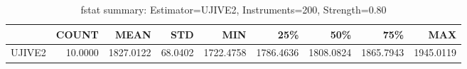 \begin{table}[ht]
\centering
\caption{fstat summary: Estimator=UJIVE2, Instruments=200, Strength=0.80}
\begin{tabular}{lrrrrrrrr}
\toprule
 & COUNT & MEAN & STD & MIN & 25\% & 50\% & 75\% & MAX \\
\midrule
UJIVE2 & 10.0000 & 1827.0122 & 68.0402 & 1722.4758 & 1786.4636 & 1808.0824 & 1865.7943 & 1945.0119 \\
\bottomrule
\end{tabular}
\end{table}
